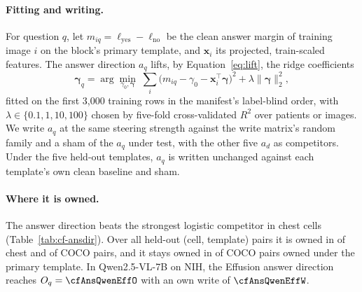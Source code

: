 \paragraph{Fitting and writing.} For question $q$, let $m_{iq}=\ell_{\mathrm{yes}}-\ell_{\mathrm{no}}$ be the clean answer margin of training image $i$ on the block's primary template, and $\boldsymbol x_i$ its projected, train-scaled features. The answer direction $a_q$ lifts, by Equation~\ref{eq:lift}, the ridge coefficients
\begin{equation}
\boldsymbol\gamma_q=\arg\min_{\gamma_0,\boldsymbol\gamma}\;\sum_{i}\bigl(m_{iq}-\gamma_0-\boldsymbol x_i^{\top}\boldsymbol\gamma\bigr)^2+\lambda\lVert\boldsymbol\gamma\rVert_2^2 ,
\label{eq:answer-direction}
\end{equation}
fitted on the first 3{,}000 training rows in the manifest's label-blind order, with $\lambda\in\{0.1,1,10,100\}$ chosen by five-fold cross-validated $R^2$ over patients or images. We write $a_q$ at the same steering strength against the write matrix's random family and a sham of the $a_q$ under test, with the other five $a_d$ as competitors. Under the five held-out templates, $a_q$ is written unchanged against each template's own clean baseline and sham.

\paragraph{Where it is owned.} The answer direction beats the strongest logistic competitor in \cfAnsChestBeats{} chest cells (Table~\ref{tab:cf-ansdir}). Over all held-out (cell, template) pairs it is owned in \cfAnsdirtChestOwnedPairs{} of \cfAnsdirtChestPairsAll{} chest and \cfAnsdirtCocoOwnedPairs{} of \cfAnsdirtCocoPairsAll{} COCO pairs, and it stays owned in \cfAnsdirtCocoKept{} of \cfAnsdirtCocoKeptN{} COCO pairs owned under the primary template. In Qwen2.5-VL-7B on NIH, the Effusion answer direction reaches $O_q=\cfAnsQwenEffO$ with an own write of $\cfAnsQwenEffW$.



